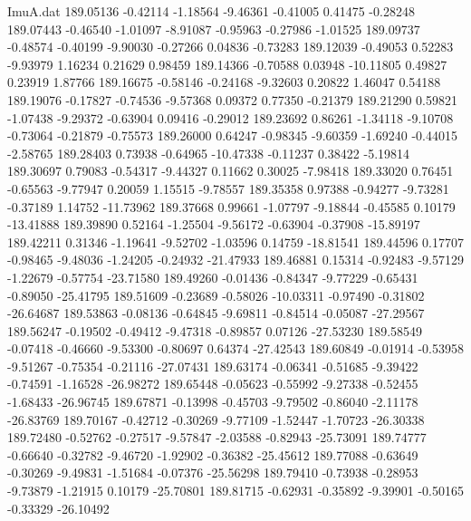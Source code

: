 \begin{filecontents}{ImuA.dat}
 189.05136   -0.42114   -1.18564   -9.46361   -0.41005    0.41475   -0.28248
 189.07443   -0.46540   -1.01097   -8.91087   -0.95963   -0.27986   -1.01525
 189.09737   -0.48574   -0.40199   -9.90030   -0.27266    0.04836   -0.73283
 189.12039   -0.49053    0.52283   -9.93979    1.16234    0.21629    0.98459
 189.14366   -0.70588    0.03948  -10.11805    0.49827    0.23919    1.87766
 189.16675   -0.58146   -0.24168   -9.32603    0.20822    1.46047    0.54188
 189.19076   -0.17827   -0.74536   -9.57368    0.09372    0.77350   -0.21379
 189.21290    0.59821   -1.07438   -9.29372   -0.63904    0.09416   -0.29012
 189.23692    0.86261   -1.34118   -9.10708   -0.73064   -0.21879   -0.75573
 189.26000    0.64247   -0.98345   -9.60359   -1.69240   -0.44015   -2.58765
 189.28403    0.73938   -0.64965  -10.47338   -0.11237    0.38422   -5.19814
 189.30697    0.79083   -0.54317   -9.44327    0.11662    0.30025   -7.98418
 189.33020    0.76451   -0.65563   -9.77947    0.20059    1.15515   -9.78557
 189.35358    0.97388   -0.94277   -9.73281   -0.37189    1.14752  -11.73962
 189.37668    0.99661   -1.07797   -9.18844   -0.45585    0.10179  -13.41888
 189.39890    0.52164   -1.25504   -9.56172   -0.63904   -0.37908  -15.89197
 189.42211    0.31346   -1.19641   -9.52702   -1.03596    0.14759  -18.81541
 189.44596    0.17707   -0.98465   -9.48036   -1.24205   -0.24932  -21.47933
 189.46881    0.15314   -0.92483   -9.57129   -1.22679   -0.57754  -23.71580
 189.49260   -0.01436   -0.84347   -9.77229   -0.65431   -0.89050  -25.41795
 189.51609   -0.23689   -0.58026  -10.03311   -0.97490   -0.31802  -26.64687
 189.53863   -0.08136   -0.64845   -9.69811   -0.84514   -0.05087  -27.29567
 189.56247   -0.19502   -0.49412   -9.47318   -0.89857    0.07126  -27.53230
 189.58549   -0.07418   -0.46660   -9.53300   -0.80697    0.64374  -27.42543
 189.60849   -0.01914   -0.53958   -9.51267   -0.75354   -0.21116  -27.07431
 189.63174   -0.06341   -0.51685   -9.39422   -0.74591   -1.16528  -26.98272
 189.65448   -0.05623   -0.55992   -9.27338   -0.52455   -1.68433  -26.96745
 189.67871   -0.13998   -0.45703   -9.79502   -0.86040   -2.11178  -26.83769
 189.70167   -0.42712   -0.30269   -9.77109   -1.52447   -1.70723  -26.30338
 189.72480   -0.52762   -0.27517   -9.57847   -2.03588   -0.82943  -25.73091
 189.74777   -0.66640   -0.32782   -9.46720   -1.92902   -0.36382  -25.45612
 189.77088   -0.63649   -0.30269   -9.49831   -1.51684   -0.07376  -25.56298
 189.79410   -0.73938   -0.28953   -9.73879   -1.21915    0.10179  -25.70801
 189.81715   -0.62931   -0.35892   -9.39901   -0.50165   -0.33329  -26.10492

\end{filecontents}
